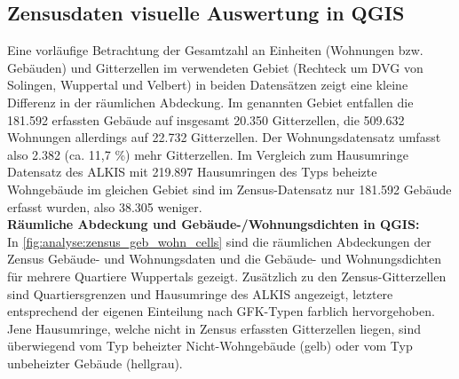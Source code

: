 		\subsection{Zensusdaten visuelle Auswertung in QGIS}
		\label{sec:analyse:zensus:qgis}
			
			Eine vorläufige Betrachtung der Gesamtzahl an Einheiten (Wohnungen bzw. Gebäuden) und Gitterzellen im verwendeten Gebiet (Rechteck um DVG von Solingen, Wuppertal und Velbert) in beiden Datensätzen zeigt eine kleine Differenz in der räumlichen Abdeckung. Im genannten Gebiet entfallen die 181.592 erfassten Gebäude auf insgesamt 20.350 Gitterzellen, die 509.632 Wohnungen allerdings auf 22.732 Gitterzellen. Der Wohnungsdatensatz umfasst also 2.382 (ca. 11,7 \%) mehr Gitterzellen. Im Vergleich zum Hausumringe Datensatz des ALKIS mit 219.897 Hausumringen des Typs beheizte Wohngebäude im gleichen Gebiet sind im Zensus-Datensatz nur 181.592 Gebäude erfasst wurden, also 38.305 weniger.\\
			
			\textbf{Räumliche Abdeckung und Gebäude-/Wohnungsdichten in QGIS:}\\
			In \autoref{fig:analyse:zensus_geb_wohn_cells} sind die räumlichen Abdeckungen der Zensus Gebäude- und Wohnungsdaten und die Gebäude- und Wohnungsdichten für mehrere Quartiere Wuppertals gezeigt. Zusätzlich zu den Zensus-Gitterzellen sind Quartiersgrenzen und Hausumringe des ALKIS angezeigt, letztere entsprechend der eigenen Einteilung nach GFK-Typen farblich hervorgehoben. Jene Hausumringe, welche nicht in Zensus erfassten Gitterzellen liegen, sind überwiegend vom Typ beheizter Nicht-Wohngebäude (gelb) oder vom Typ unbeheizter Gebäude (hellgrau). %
	
